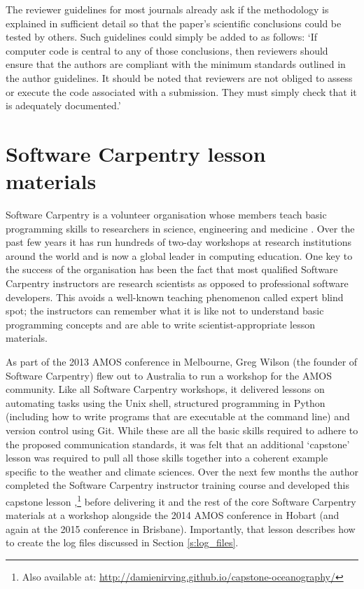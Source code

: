 The reviewer guidelines for most journals already ask if the methodology is explained in sufficient detail so that the paper's scientific conclusions could be tested by others. Such guidelines could simply be added to as follows: `If computer code is central to any of those conclusions, then reviewers should ensure that the authors are compliant with the minimum standards outlined in the author guidelines. It should be noted that reviewers are not obliged to assess or execute the code associated with a submission. They must simply check that it is adequately documented.'   



\section{Software Carpentry lesson materials}\label{s:reproducibility_lessons}

Software Carpentry is a volunteer organisation whose members teach basic programming skills to researchers in science, engineering and medicine \citep{Wilson2014}. Over the past few years it has run hundreds of two-day workshops at research institutions around the world and is now a global leader in computing education. One key to the success of the organisation has been the fact that most qualified Software Carpentry instructors are research scientists as opposed to professional software developers. This avoids a well-known teaching phenomenon called expert blind spot; the instructors can remember what it is like not to understand basic programming concepts and are able to write scientist-appropriate lesson materials.

As part of the 2013 AMOS conference in Melbourne, Greg Wilson (the founder of Software Carpentry) flew out to Australia to run a workshop for the AMOS community. Like all Software Carpentry workshops, it delivered lessons on automating tasks using the Unix shell, structured programming in Python (including how to write programs that are executable at the command line) and version control using Git. While these are all the basic skills required to adhere to the proposed communication standards, it was felt that an additional `capstone' lesson was required to pull all those skills together into a coherent example specific to the weather and climate sciences. Over the next few months the author completed the Software Carpentry instructor training course and developed this capstone lesson \citep{IrvingSWC2015},\footnote{Also available at: \url{http://damienirving.github.io/capstone-oceanography/}} before delivering it and the rest of the core Software Carpentry materials at a workshop alongside the 2014 AMOS conference in Hobart (and again at the 2015 conference in Brisbane). Importantly, that lesson describes how to create the log files discussed in Section \ref{s:log_files}. 


